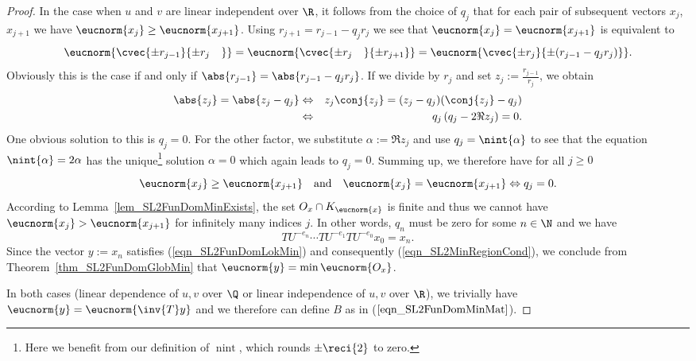 \begin{proof}
In the case when $u$ and $v$ are linear independent over $\R$, it follows from the choice of $q_j$ that for each pair of subsequent vectors $x_j$, $x_{j+1}$ we have $\eucnorm{x_j} \ge \eucnorm{x_{j+1}}$. Using $r_{j+1} = r_{j-1} - q_j r_j$ we see that $\eucnorm{x_j} = \eucnorm{x_{j+1}}$ is equivalent to
\begin{equation*}
\eucnorm{\cvec{\pm r_{j-1}}{\pm r_{j\phantom{-1}}}} = 
\eucnorm{\cvec{\pm r_{j\phantom{+1}}}{\pm r_{j+1}}} =
\eucnorm{\cvec{\pm r_j}{\pm (r_{j-1} - q_j r_j)}}.
\end{equation*}
Obviously this is the case if and only if $\abs{r_{j-1}} = \abs{r_{j-1}-q_j r_j}$. If we divide by $r_j$ and set $z_j := \frac{r_{j-1}}{r_j}$, we obtain
\begin{eqnarray*}
\abs{z_j} = \abs{z_j - q_j} 
&\Leftrightarrow& z_j \conj{z_j} = (z_j - q_j)(\conj{z_j} -q_j)\\
&\Leftrightarrow& q_j \left(q_j - 2\Re{z_j}\right) = 0.
\end{eqnarray*}
One obvious solution to this is $q_j = 0$. For the other factor, we substitute $\alpha := \Re{z_j}$ and use $q_j = \nint{\alpha}$ to see that the equation $\nint{\alpha} = 2 \alpha$ has the unique\footnote{Here we benefit from our definition of $\operatorname{nint}$, which rounds $\pm \reci{2}$ to zero.} solution $\alpha = 0$ which again leads to $q_j = 0$. Summing up, we therefore have for all $j \ge 0$
\begin{equation}
\label{eqn_SL2FunDomAlgNormDec}
\eucnorm{x_j} \ge \eucnorm{x_{j+1}} 
\quad \text{and} \quad
\eucnorm{x_j} = \eucnorm{x_{j+1}} \Leftrightarrow q_j = 0.
\end{equation}
According to Lemma~{\ref{lem_SL2FunDomMinExists}}, the set $O_x \cap K_{\eucnorm{x}}$ is finite and thus we cannot have $\eucnorm{x_j} > \eucnorm{x_{j+1}}$ for infinitely many indices $j$. In other words, $q_n$ must be zero for some $n \in \N$ and we have
\begin{equation*}
\label{mod_yDefClarity}
TU^{-e_n} \cdots TU^{-e_1} TU^{-e_0} x_0 = x_n.
\end{equation*}
Since the vector $y := x_n$ satisfies (\ref{eqn_SL2FunDomLokMin}) and consequently ({\ref{eqn_SL2MinRegionCond}}), we conclude from  Theorem~\ref{thm_SL2FunDomGlobMin} that $\eucnorm{y} = \min{\eucnorm{O_x}}$. 

In both cases (linear dependence of $u,v$ over $\Q$ or linear independence of $u,v$ over $\R$), we trivially have $\eucnorm{y} = \eucnorm{\inv{T}y}$ and we therefore can define $B$ as in ($\ref{eqn_SL2FunDomMinMat}$).
\end{proof}

